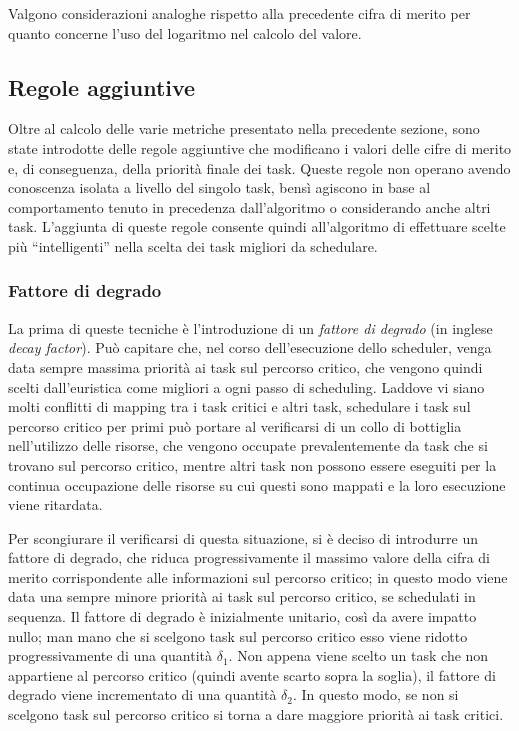 Valgono considerazioni analoghe rispetto alla precedente cifra di merito 
per quanto concerne l'uso del logaritmo nel calcolo del valore.

\subsection{Regole aggiuntive}
Oltre al calcolo delle varie metriche presentato nella precedente sezione, sono 
state introdotte delle regole aggiuntive che modificano i valori delle cifre di 
merito e, di conseguenza, della priorità finale dei task. Queste regole non 
operano avendo conoscenza isolata a livello del singolo task, bensì agiscono in 
base al comportamento tenuto in precedenza dall'algoritmo o considerando anche 
altri task. L'aggiunta di queste regole consente quindi all'algoritmo di 
effettuare scelte più ``intelligenti'' nella scelta dei task migliori da 
schedulare.

\subsubsection{Fattore di degrado}
La prima di queste tecniche è l'introduzione di un \emph{fattore di degrado} 
(in inglese \emph{decay factor}). Può capitare che, nel corso dell'esecuzione 
dello scheduler, venga data sempre massima priorità ai task sul percorso 
critico, che vengono quindi scelti dall'euristica come migliori a ogni passo di 
scheduling. Laddove vi siano molti conflitti di mapping tra i task critici
e altri task, schedulare i task sul percorso critico per primi
può portare al verificarsi di un collo di bottiglia nell'utilizzo delle 
risorse, che vengono occupate prevalentemente da task che si trovano sul 
percorso critico, mentre altri task non possono essere eseguiti per la continua 
occupazione delle risorse su cui questi sono mappati e la loro esecuzione viene
ritardata.

Per scongiurare il verificarsi di questa situazione, si è deciso di introdurre 
un fattore di degrado, che riduca progressivamente il massimo valore della 
cifra di merito corrispondente alle informazioni sul percorso critico; in 
questo modo viene data una sempre minore priorità ai task sul percorso critico,
se schedulati in sequenza. 
Il fattore di degrado è inizialmente unitario, così da avere impatto nullo; man 
mano che si scelgono task sul percorso critico esso viene ridotto 
progressivamente di una quantità $\delta_1$. Non appena viene scelto un 
task che non appartiene al percorso critico (quindi avente scarto sopra la 
soglia), il fattore di degrado viene incrementato di una quantità $\delta_2$. 
In questo modo, se non si scelgono task sul percorso critico si torna a dare 
maggiore priorità ai task critici.

